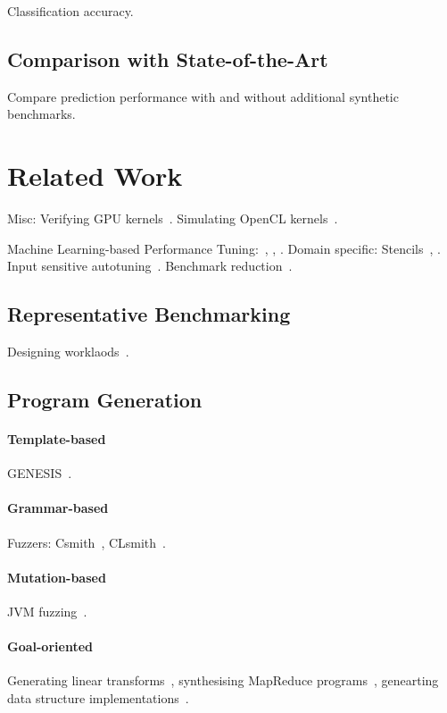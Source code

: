 \documentclass[preprint,nonatbib,10pt,nocopyrightspace]{sigplanconf}
\begin{document}
Classification accuracy.


\subsection{Comparison with State-of-the-Art}\label{subsec:}

Compare prediction performance with and without additional synthetic
benchmarks.


\section{Related Work}\label{sec:related-work}

Misc: Verifying GPU kernels~\cite{Betts2012}. Simulating OpenCL
kernels~\cite{Price2015}.

Machine Learning-based Performance Tuning:~\cite{Wen2015},
\cite{Magni2014}, \cite{Falch2015}. Domain specific:
Stencils~\cite{Garvey2015b}, \cite{Cummins2015a}. Input sensitive
autotuning~\cite{Ding2015}. Benchmark reduction~\cite{Castro2014}.


\subsection{Representative Benchmarking}

Designing worklaods~\cite{Eeckhout2002}.


\subsection{Program Generation}


\paragraph{Template-based} GENESIS~\cite{Chiu2015}.


\paragraph{Grammar-based} Fuzzers:
Csmith~\cite{Yang2012}, CLsmith~\cite{Pflanzer2016}.


\paragraph{Mutation-based} JVM fuzzing~\cite{Chena}.


\paragraph{Goal-oriented} Generating linear
transforms~\cite{Voronenko2009}, synthesising MapReduce
programs~\cite{Smith}, genearting data structure
implementations~\cite{Loncaric2016}.
\end{document}
